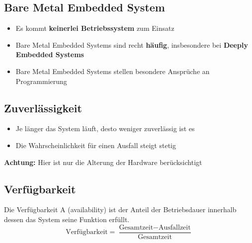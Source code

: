 \subsection{Bare Metal Embedded System}

\begin{itemize}
    \item Es kommt \textbf{keinerlei Betriebssystem} zum Einsatz
    \item Bare Metal Embedded Systems sind recht \textbf{häufig}, insbesondere bei \textbf{Deeply Embedded Systems}
    \item Bare Metal Embedded Systems stellen besondere Ansprüche an Programmierung
\end{itemize}


\subsection{Zuverlässigkeit}

\begin{minipage}[c]{0.45\columnwidth}
    
\end{minipage}
\hfill
\begin{minipage}[c]{0.5\columnwidth}
    \raggedright

    \begin{itemize}
        \item Je länger das System läuft, desto weniger zuverlässig ist es
        \item Die Wahrscheinlichkeit für einen Ausfall steigt stetig
    \end{itemize}
    
    \vspace{0.2cm}

    \textbf{Achtung:} Hier ist nur die Alterung der Hardware berücksichtigt
\end{minipage}


\subsection{Verfügbarkeit}

Die Verfügbarkeit A (availability) ist der Anteil der Betriebsdauer innerhalb dessen das System seine Funktion erfüllt.
$$ \text{Verfügbarkeit} = \frac{\text{Gesamtzeit} - \text{Ausfallzeit}}{\text{Gesamtzeit}} $$



